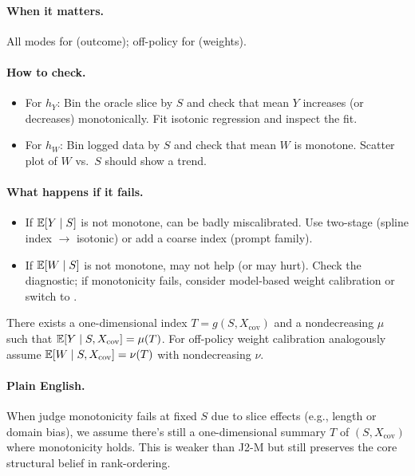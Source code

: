 \paragraph{When it matters.} All modes for \autocal{} (outcome); off-policy for \simcal{} (weights).

\paragraph{How to check.} 
\begin{itemize}
\item For $h_Y$: Bin the oracle slice by $S$ and check that mean $Y$ increases (or decreases) monotonically. Fit isotonic regression and inspect the fit.
\item For $h_W$: Bin logged data by $S$ and check that mean $W$ is monotone. Scatter plot of $W$ vs.\ $S$ should show a trend.
\end{itemize}

\paragraph{What happens if it fails.}
\begin{itemize}
\item If $\operatorname{\mathbb{E}}[Y \mid S]$ is not monotone, \autocal{} can be badly miscalibrated. Use two-stage \autocal{} (spline index $\to$ isotonic) or add a coarse index (prompt family).
\item If $\operatorname{\mathbb{E}}[W \mid S]$ is not monotone, \simcal{} may not help (or may hurt). Check the diagnostic; if monotonicity fails, consider model-based weight calibration or switch to \dr.
\end{itemize}

\begin{assumption}
\label{assump:j2mx}
There exists a one-dimensional index $T=g(S,X_{\mathrm{cov}})$ and a nondecreasing $\mu$ such that
$\operatorname{\mathbb{E}}[Y\mid S,X_{\mathrm{cov}}]=\mu(T)$.
For off-policy weight calibration analogously assume
$\operatorname{\mathbb{E}}[W\mid S,X_{\mathrm{cov}}]=\nu(T)$ with nondecreasing $\nu$.
\end{assumption}

\paragraph{Plain English.} When judge monotonicity fails at fixed $S$ due to slice effects (e.g., length or domain bias), we assume there's still a one-dimensional summary $T$ of $(S, X_{\mathrm{cov}})$ where monotonicity holds. This is weaker than J2-M but still preserves the core structural belief in rank-ordering.


